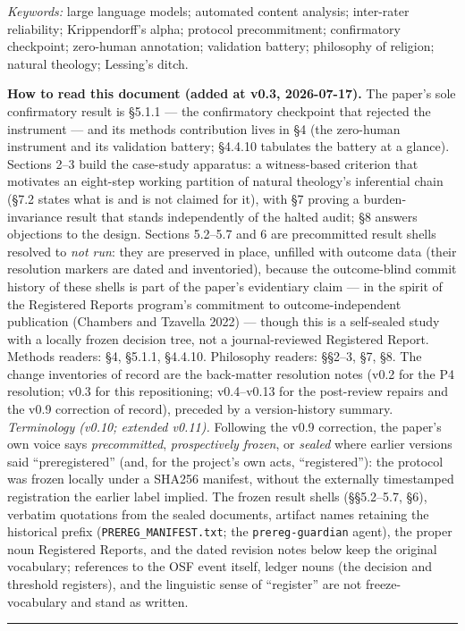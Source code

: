 \emph{Keywords:} large language models; automated content analysis; inter-rater reliability; Krippendorff's alpha; protocol precommitment; confirmatory checkpoint; zero-human annotation; validation battery; philosophy of religion; natural theology; Lessing's ditch.

\textbf{How to read this document (added at v0.3, 2026-07-17).} The paper's sole confirmatory result is \S{}5.1.1 --- the confirmatory checkpoint that rejected the instrument --- and its methods contribution lives in \S{}4 (the zero-human instrument and its validation battery; \S{}4.4.10 tabulates the battery at a glance). Sections 2--3 build the case-study apparatus: a witness-based criterion that motivates an eight-step working partition of natural theology's inferential chain (\S{}7.2 states what is and is not claimed for it), with \S{}7 proving a burden-invariance result that stands independently of the halted audit; \S{}8 answers objections to the design. Sections 5.2--5.7 and 6 are precommitted result shells resolved to \emph{not run}: they are preserved in place, unfilled with outcome data (their resolution markers are dated and inventoried), because the outcome-blind commit history of these shells is part of the paper's evidentiary claim --- in the spirit of the Registered Reports program's commitment to outcome-independent publication (Chambers and Tzavella 2022) --- though this is a self-sealed study with a locally frozen decision tree, not a journal-reviewed Registered Report. Methods readers: \S{}4, \S{}5.1.1, \S{}4.4.10. Philosophy readers: \S{}\S{}2--3, \S{}7, \S{}8. The change inventories of record are the back-matter resolution notes (v0.2 for the P4 resolution; v0.3 for this repositioning; v0.4--v0.13 for the post-review repairs and the v0.9 correction of record), preceded by a version-history summary. \emph{Terminology (v0.10; extended v0.11).} Following the v0.9 correction, the paper's own voice says \emph{precommitted}, \emph{prospectively frozen}, or \emph{sealed} where earlier versions said ``preregistered'' (and, for the project's own acts, ``registered''): the protocol was frozen locally under a SHA256 manifest, without the externally timestamped registration the earlier label implied. The frozen result shells (\S{}\S{}5.2--5.7, \S{}6), verbatim quotations from the sealed documents, artifact names retaining the historical prefix (\texttt{PREREG\_MANIFEST.txt}; the \texttt{prereg-guardian} agent), the proper noun Registered Reports, and the dated revision notes below keep the original vocabulary; references to the OSF event itself, ledger nouns (the decision and threshold registers), and the linguistic sense of ``register'' are not freeze-vocabulary and stand as written.

\begin{center}\rule{0.5\linewidth}{0.5pt}\end{center}
